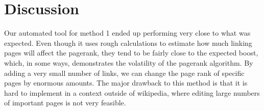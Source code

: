 \documentclass{article}
\begin{document}
\section*{Discussion}

Our automated tool for method 1 ended up performing very close to what was
expected. Even though it uses rough calculations to estimate how much linking
pages will affect the pagerank, they tend to be fairly close to the expected
boost, which, in some ways, demonstrates the volatility of the pagerank
algorithm. By adding a very small number of links, we can change the page rank
of specific pages by enormous amounts. The major drawback to this method is that
it is hard to implement in a context outside of wikipedia, where editing large
numbers of important pages is not very feasible.
\end{document}
